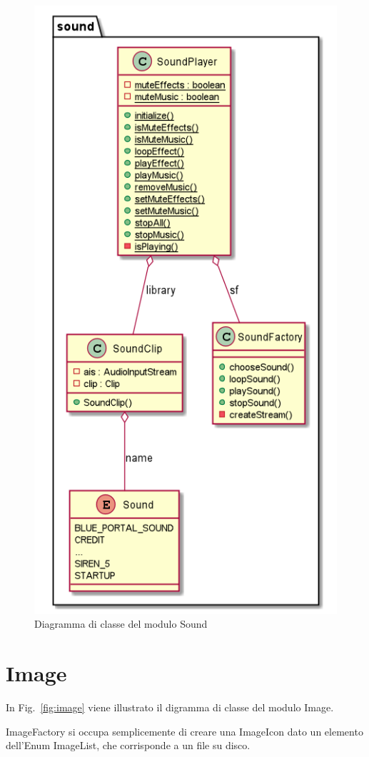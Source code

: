 \documentclass[12pt,a4paper]{report}
\begin{document}
\begin{figure}[tb]
\begin{center}
  \includegraphics[width=0.5\linewidth]{sound}
\end{center}
  \caption{Diagramma di classe del modulo Sound}
  \label{fig:sound}
\end{figure}


\section{Image}\label{se:arch.image}
In Fig.~\ref{fig:image} viene illustrato il digramma di classe del modulo Image.\newline

ImageFactory si occupa semplicemente di creare una ImageIcon dato un elemento dell’Enum ImageList, che corrisponde a un file su disco.
\end{document}
